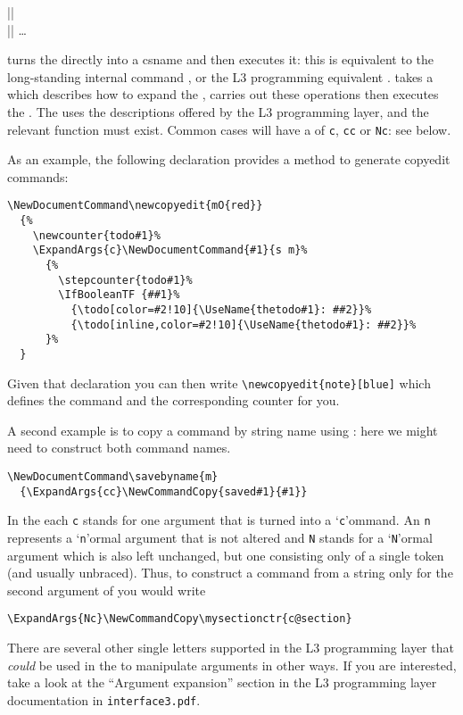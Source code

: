 \documentclass{ltxguide}
\begin{document}
\begin{decl}
  |\UseName|   \\
  |\ExpandArgs|    \dots
\end{decl}

 turns the  directly into a csname and
then executes it: this is equivalent to the long-standing
\LaTeXe{} internal command , or the L3 programming
equivalent .  takes a  which
describes how to expand the , carries out these
operations then executes the . The  uses
the descriptions offered by the L3 programming layer, and the
relevant  function must exist. Common cases will
have a  of \texttt{c}, \texttt{cc} or \texttt{Nc}: see below.

As an example, the following declaration provides a method to generate
copyedit commands:
\begin{verbatim}
\NewDocumentCommand\newcopyedit{mO{red}}
  {%
    \newcounter{todo#1}%
    \ExpandArgs{c}\NewDocumentCommand{#1}{s m}%
      {%
        \stepcounter{todo#1}%
        \IfBooleanTF {##1}%
          {\todo[color=#2!10]{\UseName{thetodo#1}: ##2}}%
          {\todo[inline,color=#2!10]{\UseName{thetodo#1}: ##2}}%
      }%
  }
\end{verbatim}
Given that declaration you can then write
\verb/\newcopyedit{note}[blue]/ which defines the command 
and the corresponding counter for you.

A second example is to copy a command by string name using
: here we might need to construct both command
names.
\begin{verbatim}
\NewDocumentCommand\savebyname{m}
  {\ExpandArgs{cc}\NewCommandCopy{saved#1}{#1}}
\end{verbatim}

In the  each \texttt{c} stands for one argument that is
turned into a `\texttt{c}'ommand. An \texttt{n} represents a
`\texttt{n}'ormal argument that is not altered and \texttt{N} stands for
a `\texttt{N}'ormal argument which is also left unchanged, but one
consisting only of a single token (and usually unbraced). Thus, to
construct a command from a string only for the second argument of
 you would write
\begin{verbatim}
\ExpandArgs{Nc}\NewCommandCopy\mysectionctr{c@section}
\end{verbatim}
There are several other single letters supported in the L3 programming
layer that \emph{could} be used in the  to manipulate
arguments in other ways.  If you are interested, take a look at the
\enquote{Argument expansion} section in the L3 programming layer
documentation in \texttt{interface3.pdf}.
\end{document}
